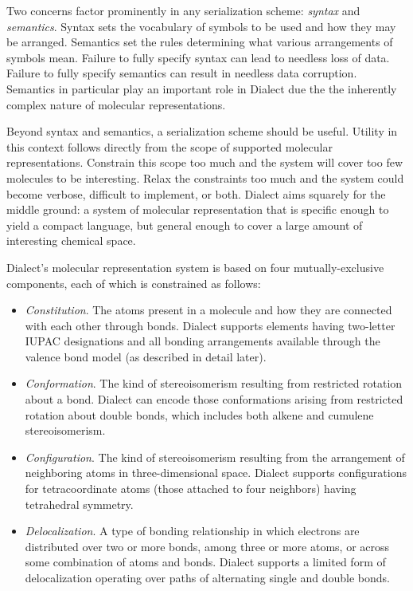 \documentclass{article}
\begin{document}
Two concerns factor prominently in any serialization scheme: \textit{syntax} and \textit{semantics}. Syntax sets the vocabulary of symbols to be used and how they may be arranged. Semantics set the rules determining what various arrangements of symbols mean. Failure to fully specify syntax can lead to needless loss of data. Failure to fully specify semantics can result in needless data corruption. Semantics in particular play an important role in Dialect due the the inherently complex nature of molecular representations.

Beyond syntax and semantics, a serialization scheme should be useful. Utility in this context follows directly from the scope of supported molecular representations. Constrain this scope too much and the system will cover too few molecules to be interesting. Relax the constraints too much and the system could become verbose, difficult to implement, or both. Dialect aims squarely for the middle ground: a system of molecular representation that is specific enough to yield a compact language, but general enough to cover a large amount of interesting chemical space.

Dialect's molecular representation system is based on four mutually-exclusive components, each of which is constrained as follows:

\begin{itemize}
\item \textit{Constitution}. The atoms present in a molecule and how they are connected with each other through bonds. Dialect supports elements having two-letter IUPAC designations and all bonding arrangements available through the valence bond model (as described in detail later).
\item \textit{Conformation}. The kind of stereoisomerism resulting from restricted rotation about a bond. Dialect can encode those conformations arising from restricted rotation about double bonds, which includes both alkene and cumulene stereoisomerism.
\item \textit{Configuration}. The kind of stereoisomerism resulting from the arrangement of neighboring atoms in three-dimensional space. Dialect supports configurations for tetracoordinate atoms (those attached to four neighbors) having tetrahedral symmetry.
\item \textit{Delocalization}. A type of bonding relationship in which electrons are distributed over two or more bonds, among three or more atoms, or across some combination of atoms and bonds. Dialect supports a limited form of delocalization operating over paths of alternating single and double bonds.
\end{itemize}
\end{document}
